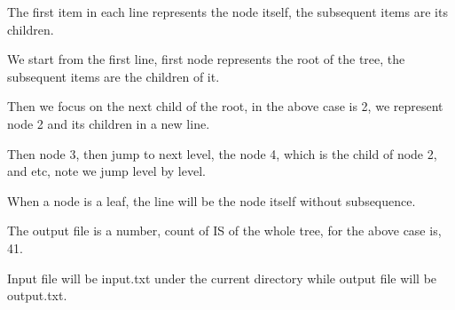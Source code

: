 \documentclass{article}
\begin{document}
\newline
The first item in each line represents the node itself, the subsequent items are its children.

We start from the first line, first node represents the root of the tree, the subsequent items are the children of it.

Then we focus on the next child of the root, in the above case is 2, we represent node 2 and its children in a new line.

Then node 3, then jump to next level, the node 4, which is the child of node 2, and etc, note we jump level by level. 

When a node is a leaf, the line will be the node itself without subsequence.


The output file is a number, count of IS of the whole tree, for the above case is, 41.

Input file will be input.txt under the current directory while output file will be output.txt.
\end{document}
